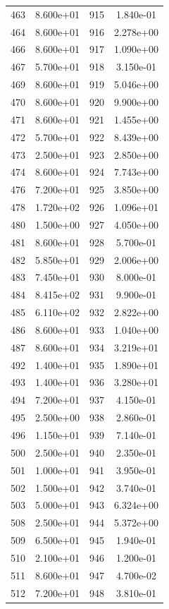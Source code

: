 \documentclass[12pt]{article}
\begin{document}
\begin{longtable}{@{}cccc@{}}
463 & 8.600e+01 & 915 & 1.840e-01 \\
464 & 8.600e+01 & 916 & 2.278e+00 \\
466 & 8.600e+01 & 917 & 1.090e+00 \\
467 & 5.700e+01 & 918 & 3.150e-01 \\
469 & 8.600e+01 & 919 & 5.046e+00 \\
470 & 8.600e+01 & 920 & 9.900e+00 \\
471 & 8.600e+01 & 921 & 1.455e+00 \\
472 & 5.700e+01 & 922 & 8.439e+00 \\
473 & 2.500e+01 & 923 & 2.850e+00 \\
474 & 8.600e+01 & 924 & 7.743e+00 \\
476 & 7.200e+01 & 925 & 3.850e+00 \\
478 & 1.720e+02 & 926 & 1.096e+01 \\
480 & 1.500e+00 & 927 & 4.050e+00 \\
481 & 8.600e+01 & 928 & 5.700e-01 \\
482 & 5.850e+01 & 929 & 2.006e+00 \\
483 & 7.450e+01 & 930 & 8.000e-01 \\
484 & 8.415e+02 & 931 & 9.900e-01 \\
485 & 6.110e+02 & 932 & 2.822e+00 \\
486 & 8.600e+01 & 933 & 1.040e+00 \\
487 & 8.600e+01 & 934 & 3.219e+01 \\
492 & 1.400e+01 & 935 & 1.890e+01 \\
493 & 1.400e+01 & 936 & 3.280e+01 \\
494 & 7.200e+01 & 937 & 4.150e-01 \\
495 & 2.500e+00 & 938 & 2.860e-01 \\
496 & 1.150e+01 & 939 & 7.140e-01 \\
500 & 2.500e+01 & 940 & 2.350e-01 \\
501 & 1.000e+01 & 941 & 3.950e-01 \\
502 & 1.500e+01 & 942 & 3.740e-01 \\
503 & 5.000e+01 & 943 & 6.324e+00 \\
508 & 2.500e+01 & 944 & 5.372e+00 \\
509 & 6.500e+01 & 945 & 1.940e-01 \\
510 & 2.100e+01 & 946 & 1.200e-01 \\
511 & 8.600e+01 & 947 & 4.700e-02 \\
512 & 7.200e+01 & 948 & 3.810e-01 \\

\end{longtable}
\end{document}
